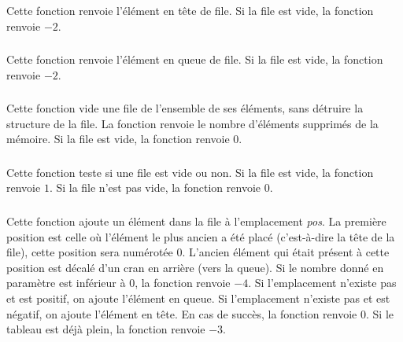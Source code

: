 \subsubsection*{}

\noindent Cette fonction renvoie l'élément en tête de file.
Si la file est vide, la fonction renvoie $ -2 $.


\subsubsection*{}

\noindent Cette fonction renvoie l'élément en queue de file.
Si la file est vide, la fonction renvoie $ -2 $.


\subsubsection*{}

\noindent Cette fonction vide une file de l'ensemble de ses éléments, sans détruire la structure de la file.
La fonction renvoie le nombre d'éléments supprimés de la mémoire.
Si la file est vide, la fonction renvoie $ 0 $.


\subsubsection*{}

\noindent Cette fonction teste si une file est vide ou non.
Si la file est vide, la fonction renvoie $ 1 $.
Si la file n'est pas vide, la fonction renvoie $ 0 $.


\subsubsection*{}

\noindent Cette fonction ajoute un élément dans la file à l'emplacement \textit{pos}.
La première position est celle où l'élément le plus ancien a été placé (c'est-à-dire la tête de la file), cette position sera numérotée $ 0 $.
L'ancien élément qui était présent à cette position est décalé d'un cran en arrière (vers la queue).
Si le nombre donné en paramètre est inférieur à $ 0 $, la fonction renvoie $ -4 $.
Si l'emplacement n'existe pas et est positif, on ajoute l'élément en queue.
Si l'emplacement n'existe pas et est négatif, on ajoute l'élément en tête.
En cas de succès, la fonction renvoie $ 0 $.
Si le tableau est déjà plein, la fonction renvoie $ -3 $.


